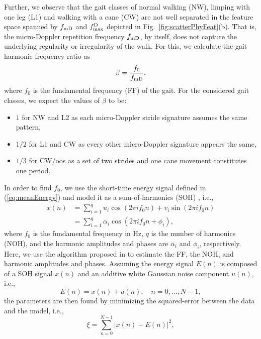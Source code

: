 Further, we observe that the gait classes of normal walking (NW), limping with one leg (L1) and walking with a cane (CW) are not well separated in the feature space spanned by ${f_\text{mD}}$ and ${f^\mathrm{D}_\text{max}}$ depicted in Fig.~\ref{fig:scatterPhyFeat}(b). That is, the micro-Doppler repetition frequency ${f_\text{mD}}$, by itself, does not capture the underlying regularity or irregularity of the walk. For this, we calculate the gait harmonic frequency ratio as \cite{Alz14}
\begin{equation}
\beta = \frac{f_0}{{f_\text{mD}}},
\label{eq:beta}
\end{equation}
where $f_0$ is the fundamental frequency (FF) of the gait. For the considered gait classes, we expect the values of $\beta$ to be:
\begin{itemize}
	\item $1$ for NW and L2 as each micro-Doppler stride signature assumes the same pattern,
	\item $1/2$ for L1 and CW as every other micro-Doppler signature appears the same,
	\item $1/3$ for CW/oos as a set of two strides and one cane movement constitutes one period.
\end{itemize}
In order to find $f_0$, we use the short-time energy signal defined in (\ref{eq:meanEnergy}) and model it as a sum-of-harmonics (SOH) \cite{Sei18}, i.e.,
\begin{equation}\label{eq:soh}
\begin{aligned}%
x(n) &= \sum_{i=1}^{q} u_i \cos(2 \pi i f_0 n ) + v_i \sin(2 \pi i f_0 n ) \\
     &= \sum_{i=1}^{q} \alpha_i \cos(2 \pi i f_0 n + \phi_i),
\end{aligned} 
\end{equation}
where $f_0$ is the fundamental frequency in Hz, $q$ is the number of harmonics (NOH), and the harmonic amplitudes and phases are $\alpha_i$ and $\phi_i$, respectively. 
Here, we use the algorithm proposed in \cite{Whi03} to estimate the FF, the NOH, and harmonic amplitudes and phases. Assuming the energy signal $E(n)$ is composed of a SOH signal $x(n)$ and an additive white Gaussian noise component $u(n)$, i.e.,
\begin{equation}\label{eq:model}
E(n) = x(n) + u(n), \quad n = 0, \dots,N-1, 
\end{equation}
the parameters are then found by minimizing the squared-error between the data and the model, i.e.,
\begin{equation}\label{eq:LS}
\xi = \sum_{n = 0}^{N-1} \left| x(n) - E(n) \right|^2,
\end{equation}
